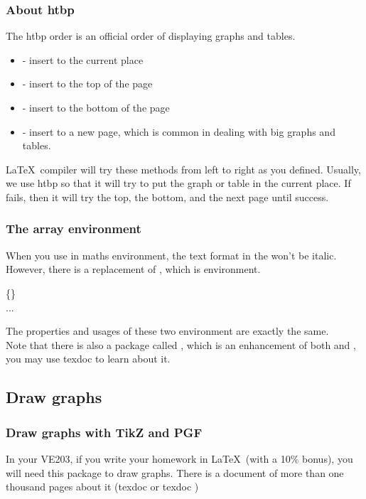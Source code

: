 \begin{frame}
	\frametitle{About htbp}
	The htbp order is an official order of displaying graphs and tables.
	\begin{itemize}
		\item {} - insert to the current place
		\item {} - insert to the top of the page
		\item {} - insert to the bottom of the page
		\item {} - insert to a new page, which is common in dealing with big graphs and tables.
	\end{itemize}
	\LaTeX\ compiler will try these methods from left to right as you defined. Usually, we use htbp so that it will try to put the graph or table in the current place. If fails, then it will try the top, the bottom, and the next page until success.
\end{frame}

\begin{frame}
	\frametitle{The array environment}
	When you use  in maths environment, the text format in the  won't be italic. However, there is a replacement of , which is  environment.
	\begin{command}
		\{\}\\
		\qquad ...\\
	\end{command}
	The properties and usages of these two environment are exactly the same. \\[0.5em]
	Note that there is also a package called , which is an enhancement of both  and , you may use \alert{texdoc}  to learn about it.
	
\end{frame}

\subsection{Draw graphs}

\begin{frame}
	\frametitle{Draw graphs with TikZ and PGF}
	In your VE203, if you write your homework in \LaTeX\ (with a 10\% bonus), you will need this package to draw graphs. There is a document of more than one thousand pages about it (\alert{texdoc}  or \alert{texdoc} )\\
	\begin{minipage}{0.45\linewidth}
		\begin{example}
			\centering
%			
		\end{example}
	\end{minipage}
	\hfill
	\begin{minipage}{0.5\linewidth}
%		
	\end{minipage}
\end{frame}

